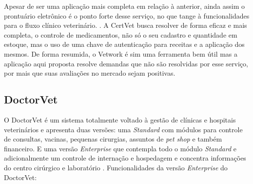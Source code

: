 \documentclass[
    12pt,               %
    openright,          %
    oneside,
    a4paper,            %
    BIBLATEX,           %
    TODO,               %
    english,            %
    brazil              %
    ]{ifsp-spo-inf-ctds}
\begin{document}
    Apesar de ser uma aplicação mais completa em relação à anterior, ainda assim o prontuário eletrônico é o ponto forte desse serviço, no que tange à funcionalidades para o fluxo clínico veterinário.  . A CertVet busca resolver de forma eficaz e mais completa, o controle de medicamentos, não só o seu cadastro e quantidade em estoque, mas o uso de uma chave de autenticação para receitas e a aplicação dos mesmos. De forma resumida, o Vetwork é sim uma ferramenta bem útil mas a aplicação aqui proposta resolve demandas que não são resolvidas por esse serviço, por mais que suas avaliações no mercado sejam positivas.

        \subsection{DoctorVet}
        O DoctorVet é um sistema totalmente voltado à gestão de clínicas e hospitais veterinários e apresenta duas versões: uma \emph{Standard} com módulos para controle de consultas, vacinas, pequenas cirurgias, assuntos de \emph{pet shop} e também financeiro. E uma versão \emph{Enterprise} que contempla todo o módulo \emph{Standard} e adicionalmente um controle de internação e hospedagem e concentra informações do centro cirúrgico e laboratório .  Funcionalidades da versão \emph{Enterprise} do DoctorVet:
\end{document}
